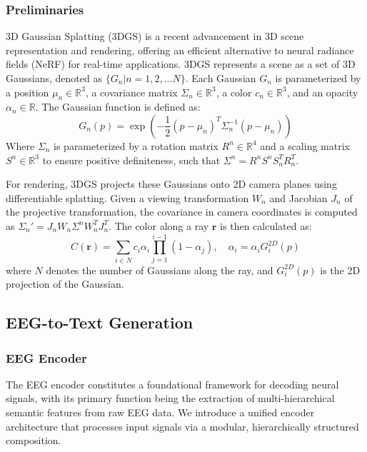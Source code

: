 \documentclass[sigconf]{acmart}
\begin{document}
\subsubsection*{\textbf{Preliminaries}}
3D Gaussian Splatting (3DGS) \cite{kerbl20233d} is a recent advancement in 3D scene representation and rendering, offering an efficient alternative to neural radiance fields (NeRF) \cite{mildenhall2021nerf} for real-time applications. 3DGS represents a scene as a set of 3D Gaussians, denoted as $\{G_n|n = 1,2,\ldots N\}$. Each Gaussian $G_n$ is parameterized by a position $\mu_n\in\mathbb{R}^3$, a covariance matrix $\Sigma_n\in\mathbb{R}^3$, a color $c_n\in\mathbb{R}^3$, and an opacity $\alpha_n\in\mathbb{R}$. The Gaussian function is defined as:
\begin{equation}
G_n(p) = \exp\left(-\frac{1}{2}(p - \mu_n)^T \Sigma_n^{-1} (p - \mu_n)\right)
\end{equation}
Where $\Sigma_n$ is parameterized by a rotation matrix $R^n\in\mathbb{R}^4$ and a scaling matrix $S^n\in\mathbb{R}^3$ to ensure positive definiteness, such that $\Sigma^n = R^nS^nS_n^TR_n^T$.

For rendering, 3DGS projects these Gaussians onto 2D camera planes using differentiable splatting. Given a viewing transformation $W_n$ and Jacobian $J_n$ of the projective transformation, the covariance in camera coordinates is computed as $\Sigma_n' = J_nW_n\Sigma^nW_n^TJ_n^T$. The color along a ray $\mathbf{r}$ is then calculated as:
\begin{equation}
C(\mathbf{r}) = \sum_{i\in N} c_i\alpha_i \prod_{j=1}^{i-1} (1 - \alpha_j), \quad \alpha_i = \alpha_iG_i^{2D}(p)
\end{equation}
where $N$ denotes the number of Gaussians along the ray, and $G_i^{2D}(p)$ is the 2D projection of the Gaussian.

\subsection{EEG-to-Text Generation}
\subsubsection*{\textbf{EEG Encoder}}
The EEG encoder constitutes a foundational framework for decoding neural signals, with its primary function being the extraction of multi-hierarchical semantic features from raw EEG data. We introduce a unified encoder architecture that processes input signals via a modular, hierarchically structured composition. 
\end{document}
